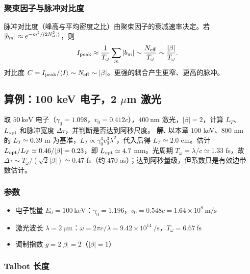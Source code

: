 \subsubsection{聚束因子与脉冲对比度}

脉冲对比度（峰高与平均密度之比）由聚束因子的衰减速率决定。若 $|b_m|\approx e^{-m^2/(2N_{\rm eff}^2)}$，则
\begin{equation}
I_{\rm peak}\approx\frac{1}{T_\omega}\sum_m|b_m|\sim\frac{N_{\rm eff}}{T_\omega}\sim\frac{|\beta|}{T_\omega}.
\label{eq:feqo-peak-intensity}
\end{equation}
对比度 $C=I_{\rm peak}/\langle I\rangle\sim N_{\rm eff}\sim|\beta|$。更强的耦合产生更窄、更高的脉冲。

\subsection{算例：100 keV 电子，2 $\mu$m 激光}


\par
\begin{workedexample}
取 $50\ \si{\kilo\electronvolt}$ 电子（$\gamma_0=1.098$，$v_0=0.412c$），$400\ \si{\nano\metre}$ 激光，$|\beta|=2$，计算 $L_T$、$L_{\rm opt}$ 和脉冲宽度 $\Delta\tau$，并判断是否达到阿秒尺度。
\textbf{解.} 以本章 $100$ keV、$800$ nm 的 $L_T\simeq0.39$ m 为基准，$L_T\propto\gamma_0^3v_0^3\lambda^2$，代入后得 $L_T\simeq2.0$ cm。估计 $L_{\rm opt}/L_T\simeq0.46/|\beta|=0.23$，即 $L_{\rm opt}\simeq4.7$ mm。光周期 $T_\omega=\lambda/c\simeq1.33$ fs，故 $\Delta\tau\sim T_\omega/(\sqrt2|\beta|)\simeq0.47$ fs（约 $470$ as）；达到阿秒量级，但系数只是有效边带数估计。
\end{workedexample}
\par
\subsubsection{参数}

\begin{itemize}
\item 电子能量 $E_0=100\ \si{\kilo\electronvolt}$：$\gamma_0=1.196$，$v_0=0.548c=1.64\times10^8\ \si{\metre\per\second}$
\item 激光波长 $\lambda=2\ \si{\micro\metre}$：$\omega=2\pi c/\lambda=9.42\times10^{14}\ \si{\per\second}$，$T_\omega=6.67\ \si{\femto\second}$
\item 调制指数 $g=2|\beta|=2$（$|\beta|=1$）
\end{itemize}

\subsubsection{Talbot 长度}

